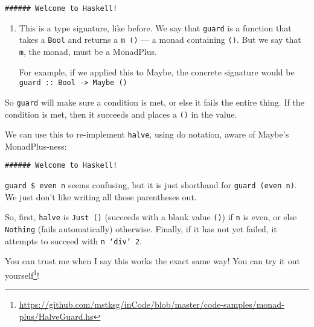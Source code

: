 \documentclass[]{article}
\newenvironment{Shaded}{}{}
\newcommand{\KeywordTok}[1]{\textcolor[rgb]{0.00,0.44,0.13}{\textbf{{#1}}}}
\newcommand{\DataTypeTok}[1]{\textcolor[rgb]{0.56,0.13,0.00}{{#1}}}
\newcommand{\DecValTok}[1]{\textcolor[rgb]{0.25,0.63,0.44}{{#1}}}
\newcommand{\CommentTok}[1]{\textcolor[rgb]{0.38,0.63,0.69}{\textit{{#1}}}}
\newcommand{\OtherTok}[1]{\textcolor[rgb]{0.00,0.44,0.13}{{#1}}}
\newcommand{\FunctionTok}[1]{\textcolor[rgb]{0.02,0.16,0.49}{{#1}}}
\newcommand{\NormalTok}[1]{{#1}}
\renewcommand{\href}[2]{#2\footnote{\url{#1}}}
\begin{document}
\begin{verbatim}
###### Welcome to Haskell!
\end{verbatim}

\begin{enumerate}
\def\labelenumi{\arabic{enumi}.}
\item
  This is a type signature, like before. We say that \texttt{guard} is a function that takes a
  \texttt{Bool} and returns a \texttt{m\ ()} --- a monad containing \texttt{()}. But we say that
  \texttt{m}, the monad, must be a MonadPlus.

  For example, if we applied this to Maybe, the concrete signature would be
  \texttt{guard\ ::\ Bool\ -\textgreater{}\ Maybe\ ()}
\end{enumerate}

So \texttt{guard} will make sure a condition is met, or else it fails the entire thing. If the
condition is met, then it succeeds and places a \texttt{()} in the value.

We can use this to re-implement \texttt{halve}, using do notation, aware of Maybe's MonadPlus-ness:

\begin{Shaded}
\end{Shaded}

\begin{verbatim}
###### Welcome to Haskell!
\end{verbatim}

\texttt{guard\ \$\ even\ n} seems confusing, but it is just shorthand for \texttt{guard\ (even\ n)}.
We just don't like writing all those parentheses out.

So, first, \texttt{halve} is \texttt{Just\ ()} (succeeds with a blank value \texttt{()}) if
\texttt{n} is even, or else \texttt{Nothing} (fails automatically) otherwise. Finally, if it has not
yet failed, it attempts to succeed with \texttt{n\ `div`\ 2}.

You can trust me when I say this works the exact same way! You can
\href{https://github.com/mstksg/inCode/blob/master/code-samples/monad-plus/HalveGuard.hs}{try it out
yourself}!
\end{document}
